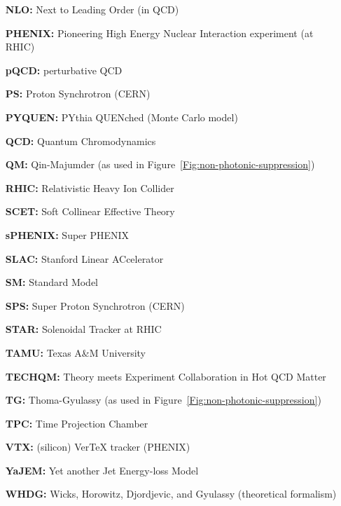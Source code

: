 \begin{itemize}
\item[\bf NLO:] Next to Leading Order (in QCD)
\item[\bf PHENIX:]  Pioneering High Energy Nuclear Interaction experiment (at RHIC)
\item[\bf pQCD:] perturbative QCD
\item[\bf PS:] Proton Synchrotron (CERN)
\item[\bf PYQUEN:] PYthia QUENched (Monte Carlo model)
\item[\bf QCD:] Quantum Chromodynamics
\item[\bf QM:] Qin-Majumder (as used in Figure~\ref{Fig:non-photonic-suppression})
\item[\bf RHIC:] Relativistic Heavy Ion Collider
\item[\bf SCET:] Soft Collinear Effective Theory 
\item[\bf sPHENIX:] Super PHENIX
\item[\bf SLAC:] Stanford Linear ACcelerator 
\item[\bf SM:] Standard Model
\item[\bf SPS:] Super Proton Synchrotron (CERN)
\item[\bf STAR:]  Solenoidal Tracker at RHIC
\item[\bf TAMU:] Texas A\&M University
\item[\bf TECHQM:] Theory meets Experiment Collaboration in Hot QCD Matter
\item[\bf TG:] Thoma-Gyulassy (as used in Figure~\ref{Fig:non-photonic-suppression})
\item[\bf TPC:] Time Projection Chamber
\item[\bf VTX:] (silicon) VerTeX tracker (PHENIX)
\item[\bf YaJEM:] Yet another Jet Energy-loss Model
\item[\bf WHDG:]  Wicks, Horowitz, Djordjevic, and Gyulassy (theoretical formalism)

\end{itemize}